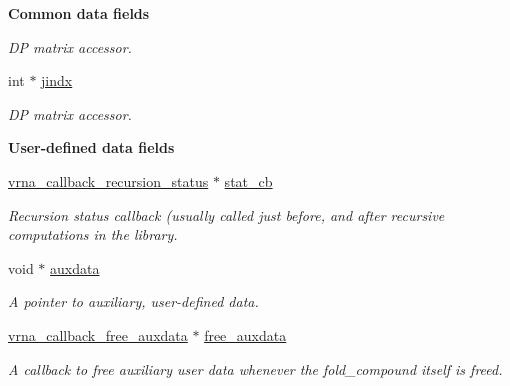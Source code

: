 \begin{Indent}{\bf Common data fields}
\begin{DoxyCompactItemize}
\begin{DoxyCompactList}\small\item\em DP matrix accessor. \end{DoxyCompactList}\item 
int $\ast$ \hyperlink{group__fold__compound_a5037235dee512efd85ca543780bbca1a}{jindx}\hypertarget{group__fold__compound_a5037235dee512efd85ca543780bbca1a}{}\label{group__fold__compound_a5037235dee512efd85ca543780bbca1a}

\begin{DoxyCompactList}\small\item\em DP matrix accessor. \end{DoxyCompactList}\end{DoxyCompactItemize}
\end{Indent}
\begin{Indent}{\bf User-\/defined data fields}\par
\begin{DoxyCompactItemize}
\item 
\hyperlink{group__fold__compound_ga4a4a0d838de6d18315bafc84f93f5cc0}{vrna\+\_\+callback\+\_\+recursion\+\_\+status} $\ast$ \hyperlink{group__fold__compound_a87a83f6795b569000efcbe65acc3dd81}{stat\+\_\+cb}
\begin{DoxyCompactList}\small\item\em Recursion status callback (usually called just before, and after recursive computations in the library. \end{DoxyCompactList}\item 
void $\ast$ \hyperlink{group__fold__compound_a20048e0c369e9f24b55423d600037c68}{auxdata}
\begin{DoxyCompactList}\small\item\em A pointer to auxiliary, user-\/defined data. \end{DoxyCompactList}\item 
\hyperlink{group__fold__compound_ga3ae51bfd5fc3236652d1de4e3274b49b}{vrna\+\_\+callback\+\_\+free\+\_\+auxdata} $\ast$ \hyperlink{group__fold__compound_a8e84dbabab016ecd74da6c38cb94e816}{free\+\_\+auxdata}
\begin{DoxyCompactList}\small\item\em A callback to free auxiliary user data whenever the fold\+\_\+compound itself is free\textquotesingle{}d. \end{DoxyCompactList}\end{DoxyCompactItemize}
\end{Indent}
